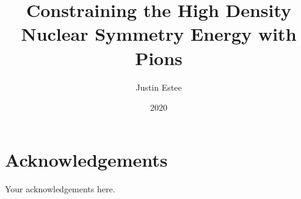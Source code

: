\documentclass[]{msu-thesis}
\title{Constraining the High Density Nuclear Symmetry Energy with Pions}
\author{Justin Estee}
\date{2020}
\begin{document}

\frontmatter
\maketitlepage
\begin{abstract}
\end{abstract}

\clearpage

\makecopyrightpage

%
%
\clearpage
\chapter*{Acknowledgements}
\DoubleSpacing %
Your acknowledgements here.
%
\clearpage
\SingleSpacing
\tableofcontents* %
\clearpage
\listoftables %
\clearpage
\listoffigures %
%
%
\mainmatter
%


%
%
%
%

\end{document}
